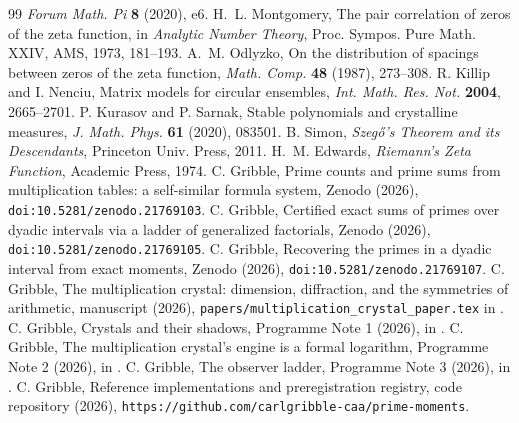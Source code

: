 \documentclass[11pt]{article}
\theoremstyle{remark}
\begin{document}
\begin{thebibliography}{99}
\emph{Forum Math. Pi} \textbf{8} (2020), e6.
 H.~L. Montgomery, The pair correlation of zeros of the zeta function, in
\emph{Analytic Number Theory}, Proc. Sympos. Pure Math. XXIV, AMS, 1973, 181--193.
 A.~M. Odlyzko, On the distribution of spacings between zeros of the zeta
function, \emph{Math. Comp.} \textbf{48} (1987), 273--308.
 R. Killip and I. Nenciu, Matrix models for circular ensembles,
\emph{Int. Math. Res. Not.} \textbf{2004}, 2665--2701.
 P. Kurasov and P. Sarnak, Stable polynomials and crystalline measures,
\emph{J. Math. Phys.} \textbf{61} (2020), 083501.
 B. Simon, \emph{Szeg\H{o}'s Theorem and its Descendants}, Princeton Univ. Press,
2011.
 H.~M. Edwards, \emph{Riemann's Zeta Function}, Academic Press, 1974.
 C. Gribble, Prime counts and prime sums from multiplication tables: a
self-similar formula system, Zenodo (2026), \texttt{doi:10.5281/zenodo.21769103}.
 C. Gribble, Certified exact sums of primes over dyadic intervals via a ladder
of generalized factorials, Zenodo (2026), \texttt{doi:10.5281/zenodo.21769105}.
 C. Gribble, Recovering the primes in a dyadic interval from exact moments,
Zenodo (2026), \texttt{doi:10.5281/zenodo.21769107}.
 C. Gribble, The multiplication crystal: dimension, diffraction, and the symmetries
of arithmetic, manuscript (2026), \texttt{papers/multiplication\_crystal\_paper.tex} in \cite{Code}.
 C. Gribble, Crystals and their shadows, Programme Note 1 (2026), in \cite{Code}.
 C. Gribble, The multiplication crystal's engine is a formal logarithm,
Programme Note 2 (2026), in \cite{Code}.
 C. Gribble, The observer ladder, Programme Note 3 (2026), in \cite{Code}.
 C. Gribble, Reference implementations and preregistration registry, code repository
(2026), \texttt{https://github.com/carlgribble-caa/prime-moments}.
\end{thebibliography}
\end{document}
